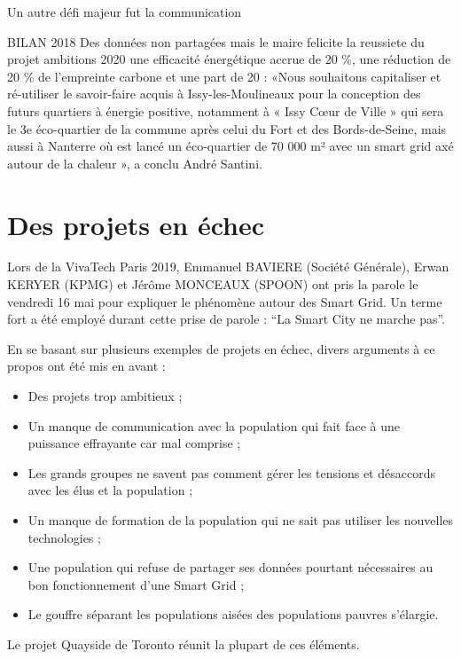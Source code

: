 Un autre défi majeur fut la communication

BILAN
2018
Des données non partagées
mais le maire felicite la reussiete du projet
ambitions 2020 une efficacité énergétique accrue de 20 \%, une réduction de 20 \% de l’empreinte carbone et une part de 20 %
: «Nous souhaitons capitaliser et ré-utiliser le savoir-faire acquis à Issy-les-Moulineaux pour la conception des futurs quartiers à énergie positive, notamment à « Issy Cœur de Ville » qui sera le 3e éco-quartier de la commune après celui du Fort et des Bords-de-Seine, mais aussi à Nanterre où est lancé un éco-quartier de 70 000 m² avec un smart grid axé autour de la chaleur », a conclu André Santini.


\section{Des projets en échec}

Lors de la VivaTech Paris 2019, Emmanuel BAVIERE (Société Générale), Erwan KERYER (KPMG) 
et Jérôme MONCEAUX (SPOON) ont pris la parole le vendredi 16 mai pour expliquer le phénomène autour des 
Smart Grid. Un terme fort a été employé durant cette prise de parole : 
``La Smart City ne marche pas''.

En se basant sur plusieurs exemples de projets en échec, divers arguments à ce propos ont été mis en 
avant : 
\begin{itemize}
    \item Des projets trop ambitieux ;
    \item Un manque de communication avec la population qui fait face à une puissance effrayante car mal comprise ;
    \item Les grands groupes ne savent pas comment gérer les tensions et désaccords avec les élus et la population ; 
    \item Un manque de formation de la population qui ne sait pas utiliser les nouvelles technologies ;
    \item Une population qui refuse de partager ses données pourtant nécessaires au bon fonctionnement d’une Smart Grid ;
    \item Le gouffre séparant les populations aisées des populations pauvres s'élargie.
\end{itemize}

Le projet Quayside de Toronto réunit la plupart de ces éléments. 
